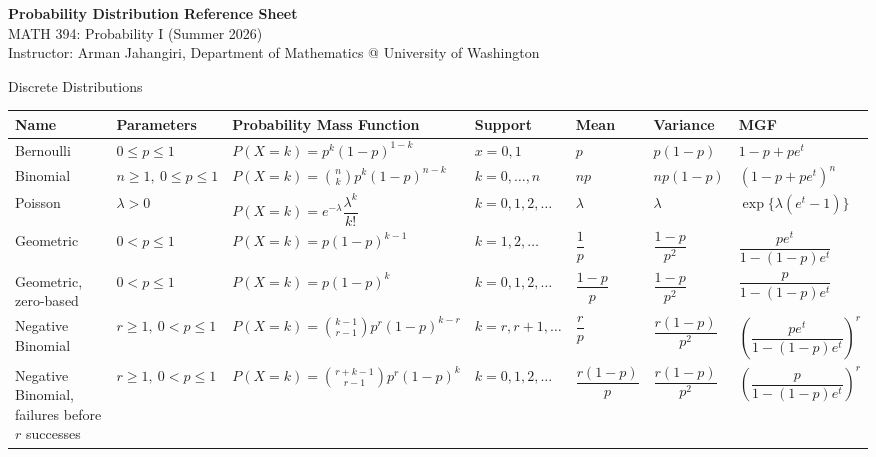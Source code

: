 \documentclass[11pt]{article}
\begin{document}
\begin{landscape}
\begin{center}
{\Large\bfseries Probability Distribution Reference Sheet}\\[-1mm]

{\normalsize MATH 394: Probability I (Summer 2026)}\\[-1mm]

{\small Instructor: Arman Jahangiri, Department of Mathematics @ University of Washington}
\end{center}
\vspace{-2mm}

\begin{distbox}{Discrete Distributions}

\small
\setlength{\tabcolsep}{3pt}
\begin{longtable}{@{}L{2.3cm} L{2.6cm} L{4.8cm} C{2.4cm} C{2.2cm} C{5cm} L{5cm}@{}}\toprule
\textbf{Name} & \textbf{Parameters} & \textbf{Probability Mass Function} & \textbf{Support} & \textbf{Mean} & \textbf{Variance} & \textbf{MGF} \\
\midrule
\endhead

Bernoulli
& $0\le p\le 1$
& $P(X=k)=p^k(1-p)^{1-k}$
& $x=0,1$
& $p$
& $p(1-p)$
& $1-p+pe^t$
\\[0.4cm]

Binomial
& $n\ge 1,\ 0\le p\le 1$
& $P(X=k)=\binom{n}{k}p^k(1-p)^{n-k}$
& $k=0,\dots,n$
& $np$
& $np(1-p)$
& $(1-p+pe^t)^n$
\\[0.4cm]

Poisson
& $\lambda>0$
& $P(X=k)=e^{-\lambda}\dfrac{\lambda^k}{k!}$
& $k=0,1,2,\dots$
& $\lambda$
& $\lambda$
& $\exp\{\lambda(e^t-1)\}$
\\[0.4cm]

Geometric
& $0<p\le 1$
& $P(X=k)=p(1-p)^{k-1}$
& $k=1,2,\dots$
& $\dfrac{1}{p}$
& $\dfrac{1-p}{p^2}$
& $\dfrac{pe^t}{1-(1-p)e^t}$
\\[0.5cm]

Geometric, zero-based
& $0<p\le 1$
& $P(X=k)=p(1-p)^k$
& $k=0,1,2,\dots$
& $\dfrac{1-p}{p}$
& $\dfrac{1-p}{p^2}$
& $\dfrac{p}{1-(1-p)e^t}$
\\[0.5cm]

Negative Binomial
& $r\ge 1,\ 0<p\le 1$
& $P(X=k)=\binom{k-1}{r-1}p^r(1-p)^{k-r}$
& $k=r,r+1,\dots$
& $\dfrac{r}{p}$
& $\dfrac{r(1-p)}{p^2}$
& $\left(\dfrac{pe^t}{1-(1-p)e^t}\right)^r$
\\[0.5cm]

Negative Binomial, failures before $r$ successes
& $r\ge 1,\ 0<p\le 1$
& $P(X=k)=\binom{r+k-1}{r-1}p^r(1-p)^k$
& $k=0,1,2,\dots$
& $\dfrac{r(1-p)}{p}$
& $\dfrac{r(1-p)}{p^2}$
& $\left(\dfrac{p}{1-(1-p)e^t}\right)^r$
\\[0.5cm]


\end{longtable}
\end{distbox}
\end{landscape}
\end{document}
